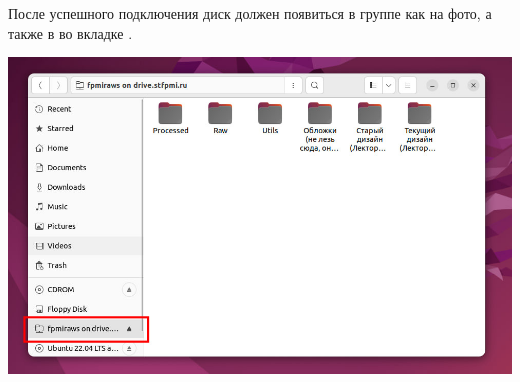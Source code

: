 После успешного подключения диск должен появиться в группе  как на фото, а также в во вкладке .

\begin{center}
  \begin{minipage}[c]{\textwidth - \fboxaddlen}
    \centering
    \includegraphics[width={\textwidth - \fboxaddlen},fbox]{Images/CloudStorage/ubuntu/nautilus/folder-in-tray.jpg}
  \end{minipage}
\end{center}
